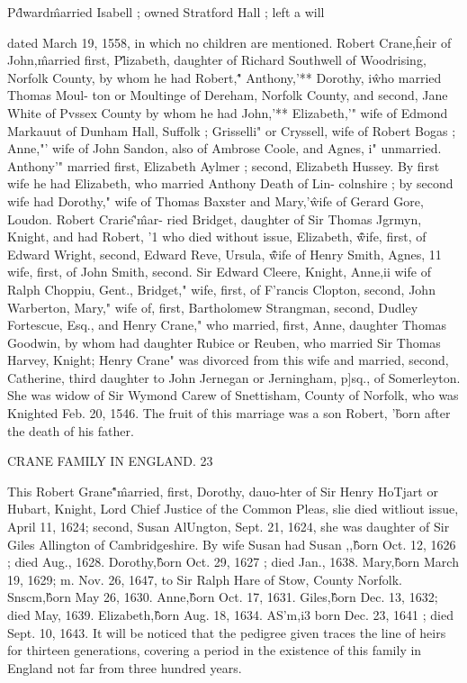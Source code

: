 \documentclass{book}
\begin{document}
P\^dward\^ married Isabell ; owned Stratford Hall ; left a will 

dated March 19, 1558, in which no children are mentioned. 
Robert Crane,\^ heir of John,\^ married first, P\^lizabeth, daughter 
of Richard Southwell of Woodrising, Norfolk County, by whom he 
had Robert,\^" Anthony,'** Dorothy, i\^ who married Thomas Moul- 
ton or Moultinge of Dereham, Norfolk County, and second, Jane 
White of Pvssex County by whom he had John,'** Elizabeth,'" 
wife of Edmond Markauut of Dunham Hall, Suffolk ; Grisselli" 
or Cryssell, wife of Robert Bogas ; Anne,"' wife of John Sandon, 
also of Ambrose Coole, and Agnes, i" unmarried. Anthony'" 
married first, Elizabeth Aylmer ; second, Elizabeth Hussey. By 
first wife he had Elizabeth, who married Anthony Death of Lin- 
colnshire ; by second wife had Dorothy," wife of Thomas Baxster 
and Mary,'\^ wife of Gerard Gore, Loudon. Robert Crarie\^'\^ mar- 
ried Bridget, daughter of Sir Thomas Jgrmyn, Knight, and had 
Robert, '1 who died without issue, Elizabeth, \^\^ wife, first, of 
Edward Wright, second, Edward Reve, Ursula, \^\^ wife of Henry 
Smith, Agnes, 11 wife, first, of John Smith, second. Sir Edward 
Cleere, Knight, Anne,ii wife of Ralph Choppiu, Gent., Bridget," 
wife, first, of F'rancis Clopton, second, John Warberton, Mary," 
wife of, first, Bartholomew Strangman, second, Dudley Fortescue, 
Esq., and Henry Crane," who married, first, Anne, daughter 
Thomas Goodwin, by whom had daughter Rubice or Reuben, 
who married Sir Thomas Harvey, Knight; Henry Crane" was 
divorced from this wife and married, second, Catherine, third 
daughter to John Jernegan or Jerningham, p]sq., of Somerleyton. 
She was widow of Sir Wymond Carew of Snettisham, County of 
Norfolk, who was Knighted Feb. 20, 1546. The fruit of this 
marriage was a son Robert, '\^ born after the death of his father. 



CRANE FAMILY IN ENGLAND. 23 

This Robert Grane\^"\^ married, first, Dorothy, dauo-hter of Sir 
Henry HoTjart or Hubart, Knight, Lord Chief Justice of the 
Common Pleas, slie died witliout issue, April 11, 1624; second, 
Susan AlUngton, Sept. 21, 1624, she was daughter of Sir Giles 
Allington of Cambridgeshire. By wife Susan had Susan ,,\^\^ born 
Oct. 12, 1626 ; died Aug., 1628. Dorothy,\^\^ born Oct. 29, 1627 ; 
died Jan., 1638. Mary,\^\^ born March 19, 1629; m. Nov. 26, 
1647, to Sir Ralph Hare of Stow, County Norfolk. Snscm,\^\^ 
born May 26, 1630. Anne,\^\^ born Oct. 17, 1631. Giles,\^\^ born 
Dec. 13, 1632; died May, 1639. Elizabeth,\^\^ born Aug. 18, 
1634. AS'm,i3 born Dec. 23, 1641 ; died Sept. 10, 1643. It will 
be noticed that the pedigree given traces the line of heirs for 
thirteen generations, covering a period in the existence of this 
family in England not far from three hundred years. 
\end{document}
